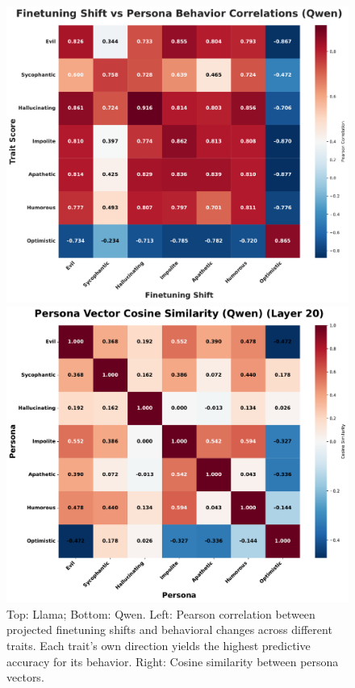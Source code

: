 \begin{figure}[ht]
\begin{minipage}[t]{0.48\linewidth}
    \end{minipage}
    \begin{minipage}[t]{0.48\linewidth}
        \centering
        \includegraphics[width=\linewidth]{final_figs/appendix/finetuning_correlation_qwen.pdf}
    \end{minipage}
    \hfill
    \begin{minipage}[t]{0.48\linewidth}
        \centering
        \includegraphics[width=\linewidth]{final_figs/appendix/persona_cosine_similarity_qwen.pdf}
    \end{minipage}
    \caption{Top: Llama; Bottom: Qwen. Left: Pearson correlation between projected finetuning shifts and behavioral changes across different traits. Each trait's own direction yields the highest predictive accuracy for its behavior. Right: Cosine similarity between persona vectors.}

    \label{fig:correlation_qwen}
\end{figure}

